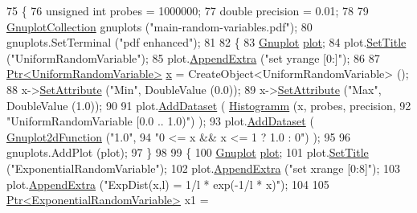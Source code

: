 \begin{DoxyCode}
75 \{
76   \textcolor{keywordtype}{unsigned} \textcolor{keywordtype}{int} probes = 1000000;
77   \textcolor{keywordtype}{double} precision = 0.01;
78 
79   \hyperlink{classns3_1_1GnuplotCollection}{GnuplotCollection} gnuplots (\textcolor{stringliteral}{"main-random-variables.pdf"});
80   gnuplots.SetTerminal (\textcolor{stringliteral}{"pdf enhanced"});
81 
82   \{
83     \hyperlink{classns3_1_1Gnuplot}{Gnuplot} \hyperlink{lte__amc_8m_a5942306abe9f005572e4344e3cdef528}{plot};
84     plot.\hyperlink{classns3_1_1Gnuplot_ac01f15633d49f0239f8a45293a1e04f0}{SetTitle} (\textcolor{stringliteral}{"UniformRandomVariable"});
85     plot.\hyperlink{classns3_1_1Gnuplot_a649a3041b9d0ea21a212b5ad9b28ecbf}{AppendExtra} (\textcolor{stringliteral}{"set yrange [0:]"});
86 
87     \hyperlink{classns3_1_1Ptr}{Ptr<UniformRandomVariable>} \hyperlink{lte__link__budget__x2__handover__measures_8m_a9336ebf25087d91c818ee6e9ec29f8c1}{x} = CreateObject<UniformRandomVariable> ();
88     x->\hyperlink{classns3_1_1ObjectBase_ac60245d3ea4123bbc9b1d391f1f6592f}{SetAttribute} (\textcolor{stringliteral}{"Min"}, DoubleValue (0.0));
89     x->\hyperlink{classns3_1_1ObjectBase_ac60245d3ea4123bbc9b1d391f1f6592f}{SetAttribute} (\textcolor{stringliteral}{"Max"}, DoubleValue (1.0));
90 
91     plot.\hyperlink{classns3_1_1Gnuplot_a306ec724a327cf9ab699700f31fca0a1}{AddDataset} ( \hyperlink{main-random-variable-stream_8cc_a2cfd3837ab3f2e816cf53486d7a186b5}{Histogramm} (x, probes, precision,
92                                   \textcolor{stringliteral}{"UniformRandomVariable [0.0 .. 1.0)"}) );
93     plot.\hyperlink{classns3_1_1Gnuplot_a306ec724a327cf9ab699700f31fca0a1}{AddDataset} ( \hyperlink{classns3_1_1Gnuplot2dFunction}{Gnuplot2dFunction} (\textcolor{stringliteral}{"1.0"},
94                                          \textcolor{stringliteral}{"0 <= x && x <= 1 ? 1.0 : 0"}) );
95 
96     gnuplots.AddPlot (plot);
97   \}
98 
99   \{
100     \hyperlink{classns3_1_1Gnuplot}{Gnuplot} \hyperlink{lte__amc_8m_a5942306abe9f005572e4344e3cdef528}{plot};
101     plot.\hyperlink{classns3_1_1Gnuplot_ac01f15633d49f0239f8a45293a1e04f0}{SetTitle} (\textcolor{stringliteral}{"ExponentialRandomVariable"});
102     plot.\hyperlink{classns3_1_1Gnuplot_a649a3041b9d0ea21a212b5ad9b28ecbf}{AppendExtra} (\textcolor{stringliteral}{"set xrange [0:8]"});
103     plot.\hyperlink{classns3_1_1Gnuplot_a649a3041b9d0ea21a212b5ad9b28ecbf}{AppendExtra} (\textcolor{stringliteral}{"ExpDist(x,l) = 1/l * exp(-1/l * x)"});
104 
105     \hyperlink{classns3_1_1Ptr}{Ptr<ExponentialRandomVariable>} x1 = 

\end{DoxyCode}
